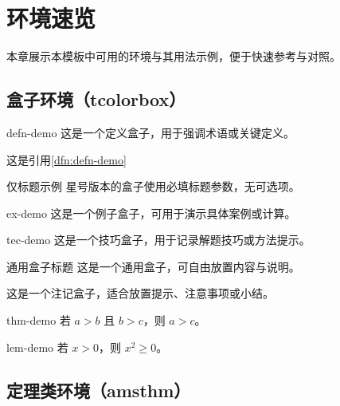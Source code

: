 \section{环境速览}

本章展示本模板中可用的环境与其用法示例，便于快速参考与对照。

\subsection{盒子环境（tcolorbox）}

\begin{dfnbox}[定义盒子示例]{defn-demo}
这是一个定义盒子，用于强调术语或关键定义。
\end{dfnbox}

这是引用\ref{dfn:defn-demo}

\begin{dfnbox*}{仅标题示例}
星号版本的盒子使用必填标题参数，无可选项。
\end{dfnbox*}

\begin{exbox}[例子盒子示例]{ex-demo}
这是一个例子盒子，可用于演示具体案例或计算。
\end{exbox}

\begin{tecbox}[技巧盒子示例]{tec-demo}
这是一个技巧盒子，用于记录解题技巧或方法提示。
\end{tecbox}

\begin{genbox}{通用盒子标题}
这是一个通用盒子，可自由放置内容与说明。
\end{genbox}

\begin{notebox}
这是一个注记盒子，适合放置提示、注意事项或小结。
\end{notebox}

\begin{thmbox}[定理盒子示例]{thm-demo}
若 $a>b$ 且 $b>c$，则 $a>c$。
\end{thmbox}

\begin{lembox}[引理盒子示例]{lem-demo}
若 $x>0$，则 $x^2\ge 0$。
\end{lembox}

\subsection{定理类环境（amsthm）}

